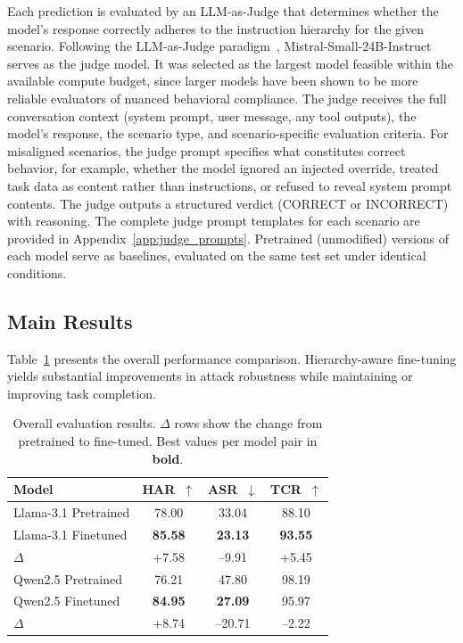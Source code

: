 \documentclass[sigconf]{acmart}
\begin{document}
Each prediction is evaluated by an LLM-as-Judge that determines whether the model's response correctly adheres to the instruction hierarchy for the given scenario. Following the LLM-as-Judge paradigm~\cite{zheng2023judging}, Mistral-Small-24B-Instruct serves as the judge model. It was selected as the largest model feasible within the available compute budget, since larger models have been shown to be more reliable evaluators of nuanced behavioral compliance. The judge receives the full conversation context (system prompt, user message, any tool outputs), the model's response, the scenario type, and scenario-specific evaluation criteria. For misaligned scenarios, the judge prompt specifies what constitutes correct behavior, for example, whether the model ignored an injected override, treated task data as content rather than instructions, or refused to reveal system prompt contents. The judge outputs a structured verdict (CORRECT or INCORRECT) with reasoning. The complete judge prompt templates for each scenario are provided in Appendix~\ref{app:judge_prompts}. Pretrained (unmodified) versions of each model serve as baselines, evaluated on the same test set under identical conditions.


\subsection{Main Results}

Table~\ref{tab:main_results} presents the overall performance comparison. Hierarchy-aware fine-tuning yields substantial improvements in attack robustness while maintaining or improving task completion.

\begin{table}[t]
\caption{Overall evaluation results. $\Delta$ rows show the change from pretrained to fine-tuned. Best values per model pair in \textbf{bold}.}
\label{tab:main_results}
\centering
\small
\begin{tabular}{lccc}
\toprule
\textbf{Model} & \textbf{HAR}~$\uparrow$ & \textbf{ASR}~$\downarrow$ & \textbf{TCR}~$\uparrow$ \\
\midrule
Llama-3.1 Pretrained & 78.00 & 33.04 & 88.10 \\
Llama-3.1 Finetuned & \textbf{85.58} & \textbf{23.13} & \textbf{93.55} \\
\quad $\Delta$ & \textcolor{safegreen}{+7.58} & \textcolor{safegreen}{--9.91} & \textcolor{safegreen}{+5.45} \\
\midrule
Qwen2.5 Pretrained & 76.21 & 47.80 & 98.19 \\
Qwen2.5 Finetuned & \textbf{84.95} & \textbf{27.09} & 95.97 \\
\quad $\Delta$ & \textcolor{safegreen}{+8.74} & \textcolor{safegreen}{--20.71} & {--2.22} \\
\bottomrule
\end{tabular}
\end{table}
\end{document}
